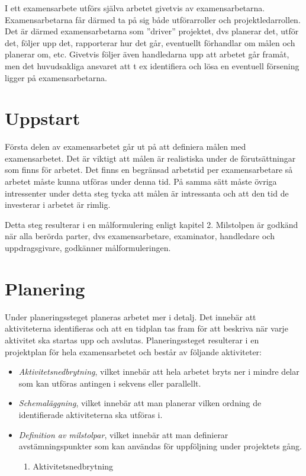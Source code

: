 I ett examensarbete utförs själva arbetet givetvis av examensarbetarna.
Examensarbetarna får därmed ta på sig både utförarroller och
projektledarrollen. Det är därmed examensarbetarna som ''driver''
projektet, dvs planerar det, utför det, följer upp det, rapporterar hur
det går, eventuellt förhandlar om målen och planerar om, etc. Givetvis
följer även handledarna upp att arbetet går framåt, men det huvudsakliga
ansvaret att t ex identifiera och lösa en eventuell försening ligger på
examensarbetarna.

\section{Uppstart}\label{uppstart}

Första delen av examensarbetet går ut på att definiera målen med
examensarbetet. Det är viktigt att målen är realistiska under de
förutsättningar som finns för arbetet. Det finns en begränsad arbetstid
per examensarbetare så arbetet måste kunna utföras under denna tid. På
samma sätt måste övriga intressenter under detta steg tycka att målen är
intressanta och att den tid de investerar i arbetet är rimlig.

Detta steg resulterar i en målformulering enligt kapitel 2. Milstolpen
är godkänd när alla berörda parter, dvs examensarbetare, examinator,
handledare och uppdragsgivare, godkänner målformuleringen.

\section{Planering}\label{planering}

Under planeringssteget planeras arbetet mer i detalj. Det innebär att
aktiviteterna identifieras och att en tidplan tas fram för att beskriva
när varje aktivitet ska startas upp och avslutas. Planeringssteget
resulterar i en projektplan för hela examensarbetet och består av
följande aktiviteter:

\begin{itemize}
\item
  \emph{Aktivitetsnedbrytning}, vilket innebär att hela arbetet bryts
  ner i mindre delar som kan utföras antingen i sekvens eller
  parallellt.
\item
  \emph{Schemaläggning}, vilket innebär att man planerar vilken ordning
  de identifierade aktiviteterna ska utföras i.
\item
  \emph{Definition av milstolpar}, vilket innebär att man definierar
  avstämningspunkter som kan användas för uppföljning under projektets
  gång.

  \begin{enumerate}
  \def\labelenumi{\arabic{enumi}.}
  \item
    \protect\hypertarget{_Ref137390038}{}{}Aktivitetsnedbrytning
  \end{enumerate}
\end{itemize}

